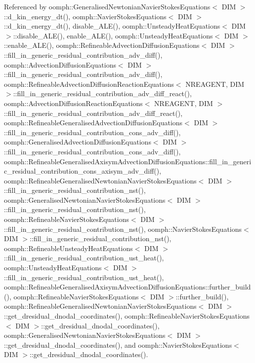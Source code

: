 Referenced by oomph\+::\+Generalised\+Newtonian\+Navier\+Stokes\+Equations$<$ D\+I\+M $>$\+::d\+\_\+kin\+\_\+energy\+\_\+dt(), oomph\+::\+Navier\+Stokes\+Equations$<$ D\+I\+M $>$\+::d\+\_\+kin\+\_\+energy\+\_\+dt(), disable\+\_\+\+A\+L\+E(), oomph\+::\+Unsteady\+Heat\+Equations$<$ D\+I\+M $>$\+::disable\+\_\+\+A\+L\+E(), enable\+\_\+\+A\+L\+E(), oomph\+::\+Unsteady\+Heat\+Equations$<$ D\+I\+M $>$\+::enable\+\_\+\+A\+L\+E(), oomph\+::\+Refineable\+Advection\+Diffusion\+Equations$<$ D\+I\+M $>$\+::fill\+\_\+in\+\_\+generic\+\_\+residual\+\_\+contribution\+\_\+adv\+\_\+diff(), oomph\+::\+Advection\+Diffusion\+Equations$<$ D\+I\+M $>$\+::fill\+\_\+in\+\_\+generic\+\_\+residual\+\_\+contribution\+\_\+adv\+\_\+diff(), oomph\+::\+Refineable\+Advection\+Diffusion\+Reaction\+Equations$<$ N\+R\+E\+A\+G\+E\+N\+T, D\+I\+M $>$\+::fill\+\_\+in\+\_\+generic\+\_\+residual\+\_\+contribution\+\_\+adv\+\_\+diff\+\_\+react(), oomph\+::\+Advection\+Diffusion\+Reaction\+Equations$<$ N\+R\+E\+A\+G\+E\+N\+T, D\+I\+M $>$\+::fill\+\_\+in\+\_\+generic\+\_\+residual\+\_\+contribution\+\_\+adv\+\_\+diff\+\_\+react(), oomph\+::\+Refineable\+Generalised\+Advection\+Diffusion\+Equations$<$ D\+I\+M $>$\+::fill\+\_\+in\+\_\+generic\+\_\+residual\+\_\+contribution\+\_\+cons\+\_\+adv\+\_\+diff(), oomph\+::\+Generalised\+Advection\+Diffusion\+Equations$<$ D\+I\+M $>$\+::fill\+\_\+in\+\_\+generic\+\_\+residual\+\_\+contribution\+\_\+cons\+\_\+adv\+\_\+diff(), oomph\+::\+Refineable\+Generalised\+Axisym\+Advection\+Diffusion\+Equations\+::fill\+\_\+in\+\_\+generic\+\_\+residual\+\_\+contribution\+\_\+cons\+\_\+axisym\+\_\+adv\+\_\+diff(), oomph\+::\+Refineable\+Generalised\+Newtonian\+Navier\+Stokes\+Equations$<$ D\+I\+M $>$\+::fill\+\_\+in\+\_\+generic\+\_\+residual\+\_\+contribution\+\_\+nst(), oomph\+::\+Generalised\+Newtonian\+Navier\+Stokes\+Equations$<$ D\+I\+M $>$\+::fill\+\_\+in\+\_\+generic\+\_\+residual\+\_\+contribution\+\_\+nst(), oomph\+::\+Refineable\+Navier\+Stokes\+Equations$<$ D\+I\+M $>$\+::fill\+\_\+in\+\_\+generic\+\_\+residual\+\_\+contribution\+\_\+nst(), oomph\+::\+Navier\+Stokes\+Equations$<$ D\+I\+M $>$\+::fill\+\_\+in\+\_\+generic\+\_\+residual\+\_\+contribution\+\_\+nst(), oomph\+::\+Refineable\+Unsteady\+Heat\+Equations$<$ D\+I\+M $>$\+::fill\+\_\+in\+\_\+generic\+\_\+residual\+\_\+contribution\+\_\+ust\+\_\+heat(), oomph\+::\+Unsteady\+Heat\+Equations$<$ D\+I\+M $>$\+::fill\+\_\+in\+\_\+generic\+\_\+residual\+\_\+contribution\+\_\+ust\+\_\+heat(), oomph\+::\+Refineable\+Generalised\+Axisym\+Advection\+Diffusion\+Equations\+::further\+\_\+build(), oomph\+::\+Refineable\+Navier\+Stokes\+Equations$<$ D\+I\+M $>$\+::further\+\_\+build(), oomph\+::\+Refineable\+Generalised\+Newtonian\+Navier\+Stokes\+Equations$<$ D\+I\+M $>$\+::get\+\_\+dresidual\+\_\+dnodal\+\_\+coordinates(), oomph\+::\+Refineable\+Navier\+Stokes\+Equations$<$ D\+I\+M $>$\+::get\+\_\+dresidual\+\_\+dnodal\+\_\+coordinates(), oomph\+::\+Generalised\+Newtonian\+Navier\+Stokes\+Equations$<$ D\+I\+M $>$\+::get\+\_\+dresidual\+\_\+dnodal\+\_\+coordinates(), and oomph\+::\+Navier\+Stokes\+Equations$<$ D\+I\+M $>$\+::get\+\_\+dresidual\+\_\+dnodal\+\_\+coordinates().

